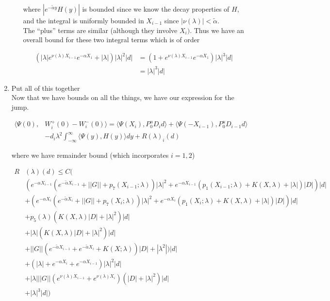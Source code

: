 \documentclass[12pt]{article}
\begin{document}
\begin{enumerate}
\begin{enumerate}
where $|e^{-\tilde{\alpha} y} H(y)|$ is bounded since we know the decay properties of $H$, and the integral is uniformly bounded in $X_{i-1}$ since $|\nu(\lambda)| < \tilde{\alpha}$. \\

The ``plus'' terms are similar (although they involve $X_i)$. Thus we have an overall bound for these two integral terms which is of order

\begin{align*}
(|\lambda| e^{\nu(\lambda)X_{i-1}} e^{-\alpha X_1} + |\lambda|)|\lambda|^2 |d|
&= (1 + e^{\nu(\lambda)X_{i-1}} e^{-\alpha X_1})|\lambda|^3 |d| \\
&= |\lambda|^3 |d|
\end{align*}

\end{enumerate}


\item Put all of this together\\

Now that we have bounds on all the things, we have our expression for the jump.

\begin{align*}
\langle \Psi(0), &W_i^+(0) - W_i^-(0) \rangle = 
\langle \Psi(X_i), P^u_0 D_i d \rangle + \langle \Psi(-X_{i-1}), P^u_0 D_{i-1} d \rangle \\
&- d_i \lambda^2 \int_{-\infty}^\infty \langle \Psi(y), H(y) \rangle dy + R(\lambda)_i(d)
\end{align*}

where we have remainder bound (which incorporates $i = 1, 2$)

\begin{align*}
R&(\lambda)(d) \leq C \Big( \\
&(e^{-\alpha X_{i-1}}(e^{-\tilde{\alpha} X_{i-1}} + ||G|| + p_7(X_{i-1}; \lambda))|\lambda|^2 + e^{-\alpha X_{i-1}}(p_1(X_{i-1}; \lambda) + K(X, \lambda) + |\lambda|) |D|)|d| \\
&+(e^{-\alpha X_i}(e^{-\tilde{\alpha} X_i} + ||G|| + p_7(X_i; \lambda))|\lambda|^2 + e^{-\alpha X_i}(p_1(X_i; \lambda) + K(X, \lambda) + |\lambda|) |D|)|d|\\
&+ p_5(\lambda) ( K(X, \lambda) |D|+ |\lambda|^2 )|d| \\
&+ |\lambda| ( K(X, \lambda) |D|+ |\lambda|^2 )|d| \\
&+ ||G|| ( e^{-\tilde{\alpha} X_{i-1}} + e^{-\tilde{\alpha} X_i} + K(X; \lambda))|D| + |\lambda^2|)|d| \\
&+ ( |\lambda| + e^{-\alpha X_i} + e^{-\alpha X_{i-1}} ) |\lambda|^2 |d| \\
&+ |\lambda| ||G|| (e^{\nu(\lambda)X_{i-1}} + e^{\nu(\lambda)X_i})(|D| + |\lambda|^2 )|d|  \\
&+ |\lambda|^3 |d| \Big)
\end{align*}


\end{enumerate}
\end{document}
